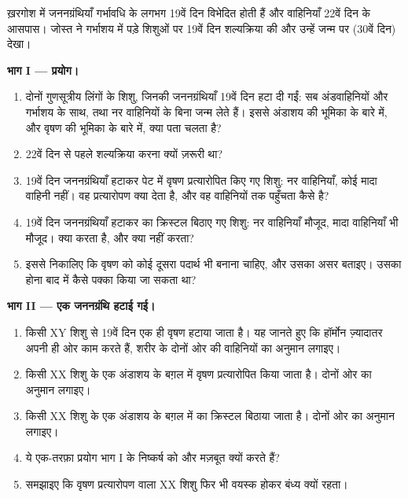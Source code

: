 \begin{problem}
\label{pb:g11:becoming-male-female:1}
ख़रगोश में जननग्रंथियाँ गर्भावधि के लगभग 19वें दिन विभेदित होती हैं और
वाहिनियाँ 22वें दिन के आसपास। जोस्त ने गर्भाशय में पड़े शिशुओं पर 19वें
दिन शल्यक्रिया की और उन्हें जन्म पर (30वें दिन) देखा।

\medskip
\noindent\textbf{भाग I --- प्रयोग।}
\begin{enumerate}
  \item दोनों गुणसूत्रीय लिंगों के शिशु, जिनकी जननग्रंथियाँ 19वें दिन हटा
        दी गईं: सब अंडवाहिनियों और गर्भाशय के साथ, तथा नर वाहिनियों के
        बिना जन्म लेते हैं। इससे अंडाशय की भूमिका के बारे में, और वृषण की
        भूमिका के बारे में, क्या पता चलता है?
  \item 22वें दिन से पहले शल्यक्रिया करना क्यों ज़रूरी था?
  \item 19वें दिन जननग्रंथियाँ हटाकर पेट में वृषण प्रत्यारोपित किए गए
        शिशु: नर वाहिनियाँ, कोई मादा वाहिनी नहीं। वह प्रत्यारोपण क्या देता
        है, और वह वाहिनियों तक पहुँचता कैसे है?
  \item 19वें दिन जननग्रंथियाँ हटाकर  का क्रिस्टल बिठाए गए
        शिशु: नर वाहिनियाँ मौजूद, मादा वाहिनियाँ भी मौजूद। 
        क्या करता है, और क्या नहीं करता?
  \item इससे निकालिए कि वृषण को कोई दूसरा पदार्थ भी बनाना चाहिए, और उसका
        असर बताइए। उसका होना बाद में कैसे पक्का किया जा सकता था?
\end{enumerate}

\medskip
\noindent\textbf{भाग II --- एक जननग्रंथि हटाई गई।}
\begin{enumerate}[resume]
  \item किसी XY शिशु से 19वें दिन एक ही वृषण हटाया जाता है। यह जानते हुए
        कि हॉर्मोन ज़्यादातर अपनी ही ओर काम करते हैं, शरीर के दोनों ओर की
        वाहिनियों का अनुमान लगाइए।
  \item किसी XX शिशु के एक अंडाशय के बग़ल में वृषण प्रत्यारोपित किया जाता
        है। दोनों ओर का अनुमान लगाइए।
  \item किसी XX शिशु के एक अंडाशय के बग़ल में  का क्रिस्टल
        बिठाया जाता है। दोनों ओर का अनुमान लगाइए।
  \item ये एक-तरफ़ा प्रयोग भाग I के निष्कर्ष को और मज़बूत क्यों करते हैं?
  \item समझाइए कि वृषण प्रत्यारोपण वाला XX शिशु फिर भी वयस्क होकर बंध्य
        क्यों रहता।
\end{enumerate}


\end{problem}
